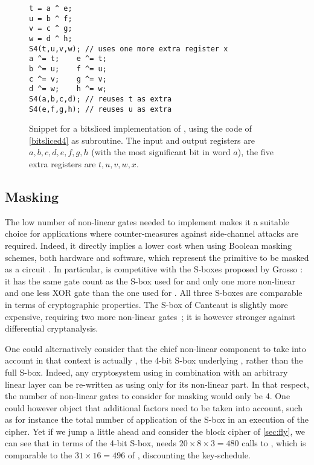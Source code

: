 \begin{figure}[ht]
\begin{verbatim}
t = a ^ e;
u = b ^ f;
v = c ^ g;
w = d ^ h;
S4(t,u,v,w); // uses one more extra register x
a ^= t;    e ^= t;
b ^= u;    f ^= u;
c ^= v;    g ^= v;
d ^= w;    h ^= w;
S4(a,b,c,d); // reuses t as extra
S4(e,f,g,h); // reuses u as extra
\end{verbatim}
\caption[Snippet for a bitsliced \C implementation of \littlunOne.]{Snippet for a bitsliced \C implementation of \littlunOne, using the code of \autoref{bitsliced4} as subroutine\label{bitsliced8}. The input and output registers
are $a,b,c,d,e,f,g,h$ (with the most significant bit in word $a$), the five extra registers are $t,u,v,w,x$.}
\end{figure}


\subsection{Masking}
The low number of non-linear gates needed to implement \littlunOne makes it a suitable choice for applications where counter-measures against side-channel attacks are required.
Indeed, it directly implies a lower cost when using Boolean masking schemes, both hardware and software, which represent the primitive to be masked as a circuit \cite{isw,DBLP:conf/fse/CarletGPQR12}.
In particular, \littlunOne is competitive with the S-boxes proposed by Grosso \etal \cite{lsdesigns}: it has the same gate count as the S-box used for \robin and only
one more non-linear and one less XOR gate than the one used for \fantomas. All three S-boxes are comparable in terms of cryptographic properties.
The S-box of Canteaut \etal is slightly more expensive, requiring two more non-linear gates~\cite{sac15}; it is however stronger against differential cryptanalysis.

One could alternatively consider that the chief non-linear component to take into account in that context is actually \littlunS, the 4-bit S-box underlying \littlunOne, rather than the full S-box.
Indeed, any cryptosystem using \littlunOne in combination with an arbitrary linear layer
can be re-written as using only \littlunS for its non-linear part. In that respect, the number of non-linear gates to consider for masking would only be 4. One could however
object that
additional factors need to be taken into account, such as for instance the total number of application of the S-box in an execution of the cipher. Yet if we jump a little ahead and
consider the block cipher \fly of \autoref{sec:fly}, we can see that in terms of the 4-bit S-box, \fly needs $20\times8\times3 = 480$ calls to \littlunS, which is
comparable to the $31\times16 = 496$ of \present, discounting the key-schedule.

